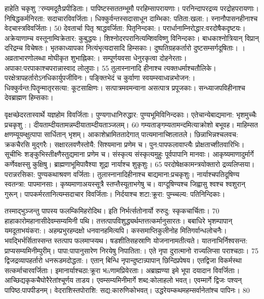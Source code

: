 हाहेति चकृशु ?रम्यमदूतैःप्रपीडिताः।
 पापिष्टस्सततम्भूमौ परहिम्सापरायणाः।
 परनिन्दापरद्रव्य परद्रोहपरायणाः।
 निषिद्धकर्मनिरता: सदाचारविवर्जिताः।
 धिक्कुर्वन्तस्सदासाधून दाम्भिका: पतिता:खला:।
 स्नानौपासनहीनाश्च वेदचास्त्रविवर्जिताः।
 50 देवतार्चा पितृ श्राद्धवर्जिता: पितृनिन्दका:।
 परार्धानाम्निरोद्धार:वरदोषैकदृष्टयः।
 अक्रेयाणाम्च वस्तूनाम्विक्रेतार: कुबुद्धयः।
 शिश्नोदरपरानित्यम्शिवविष्णु विनिन्दकाः।
 बाधकाश्नोत्रियान् विप्रान् दरिद्रम्च विचेषतः।
 भृतकाध्यापका नित्यंभृत्यदासादि हिम्सकाः।
 दुष्पतिग्रहकर्तारो दुष्टसम्सर्गदूषिताः।
 ।
 अव्रताभारणोलब्धा मोघीकृत शुभाह्निका:।
 सम्पूर्णयवसा धेनुरकृत्वा दोहनेरताः।
 अपाका:परपाकाश्चपरान्नास्वाद लोलुपाः।
 55 तुलास्नानादि हीनाश्च त्यक्तधर्माश्चतौलिके।
 परक्षेत्रापहर्तारोऽनधिकार्युपजीविनः।
 पङ्क्तिभेदं च कुर्वाणा स्वयम्स्वाध्वन्नभोजन:।
 धिक्कुर्वन्त:पितॄन्मातृरसत्या: कूटसाक्षिणः।
 सत्पात्रमवमन्वाना असत्पात्र प्रपूजकाः।
 सन्ध्याजपविहीनाश्च देवब्राह्मण हिम्सकाः।
 

वृक्षच्छेदरतास्वार्थे यज्ञहोम विवर्जिताः।
 पुण्यगाधानिरुद्धार: पुण्यभूमिविनिन्दकाः।
 एतेचान्येबाद्यमाना: भृशमुच्चैः प्रचकृशु :।
 दीयताम्दीयतामन्नम्दीयाताम्दीयताञ्जलम्।
 60 गम्यताङ्गम्यतामन्दमित्याक्रोशो बभूवह।
 माहिम्सत क्षणम्यूयम्क्षुत्पापा सार्धितान् भृशम्।
 आकाशेभ्रामिततादेगात् पात्यमानाच्शिलातले।
 छिन्नाभिन्नश्चलवच: क्रकचैरसि मुद्गरैः।
 सक्षारलवणैस्तोयै: सिश्यमाना प्रणेम च।
 पुन:पापफलावाप्त्यैः प्रोक्षताच्शीतवारिभिः।
 सूचीभिः शङ्कुभिस्तीक्ष्णैस्तुद्यमाना प्रणेम च।
 संस्कृत्य संस्कृत्यमुहुः पूर्वपापानि मानवाः।
 आकृष्यमाणादुर्मार्गे कर्णेवक्षस्सु कुक्षिषु।
 ब्राह्मणाभूमिपावैश्या शूद्रा नार्याश्च शुकृशुः।
 65 परदोषेक्षकामन्त्रयोक्तारो द्रव्यलिप्सया।
 परान्नरसिका: पुण्यकथाश्रवण वर्जिताः।
 तुलास्नानादिहीनाश्च बाद्यमाना:प्रचकृशुः।
 नार्याश्चपतिदूषिण्य स्वतन्त्रा: पापमानसाः।
 कृष्यमाणाअयस्सूत्रै स्तप्त्तैस्यूताभगेषु च।
 वाग्दूषिण्यश्च जिह्वासु श्वश्च श्वशुरान् गुरून्।
 पापकर्मरतानित्यम्सदाचार विवर्जिताः।
 निर्दयाश्च शटा:क्रूरा: पुम्च्चल्य: पतिनिन्दिकाः।
 

तस्माद्भुञ्जन्तु पापस्य फलम्किमिहरोदिथ।
 इति निर्भर्त्सतोनार्यो रुरुदु: स्कृकचार्चिताः।
 70 हाहाकारोमहानासीदेवम्सम्यमिनी पथि।
 तत्तत्पापविशुद्ध्यर्थम्तत्तत्कर्मानुसारतः।
 बबाधिरे भृशम्पापान् यमदूताभयंकरा:।
 अहम्प्रभुरहम्दक्षो धनवानहमित्यपि।
 कस्समाप्तिकुलीनोह मितिगर्वान्धलोचनैः।
 भवद्भिर्भर्सितास्सन्त स्तत्पाप फलमाप्स्यथ।
 षडशीतिसहस्राणि योजनानामतीत्यते।
 यातनाभिर्निश्वसन्त: प्राप्यसम्यमिनीम्पुरीम्।
 पापा:पापानुसारेण निरयेषु निपातिता:।
 एते नृपा दुरात्मानो राज्यलिप्सा पराश्चठाः।
 75 द्विजद्रव्यापहर्तारो धनरूडमदोद्धता:।
 एतान् बिन्धि नृपान्दुष्टान्न्पापान् छिन्दिप्रपेषय।
 एतद्विजा विकर्मस्था सत्कर्माचारवर्जिताः।
 इमानार्याश्चठा:क्रूरा भāणामप्रियेरताः।
 अब्राह्मण्या इमे भूपा दयादान विवर्जिताः।
 आच्छिद्यकृकचैघोरैरेतांश्चूर्णय ताडय।
 एवम्सम्यमिनीमार्गे शब्द:कोलाहलो भवत्।
 एवम्मार्गे द्विजः पश्यन् पापिष्ठ:पापपीडनम्।
 वेदराशिस्तपोराशि: सद्य:कारुणिकोभवत्।
 उद्धरेयम्कथमहम्सर्वानेतांश्च पापिनः।
 80

